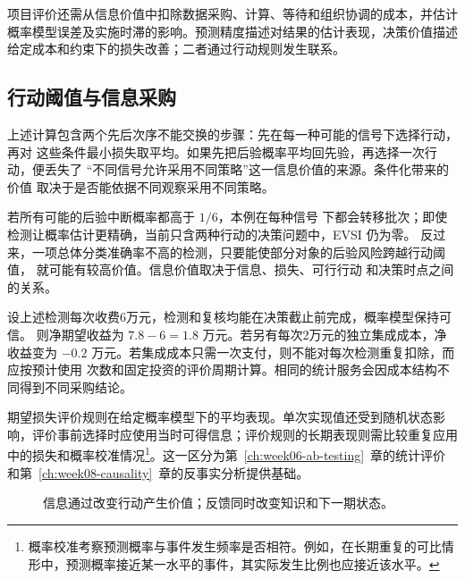 项目评价还需从信息价值中扣除数据采购、计算、等待和组织协调的成本，并估计概率模型误差及实施时滞的影响。预测精度描述对结果的估计表现，决策价值描述给定成本和约束下的损失改善；二者通过行动规则发生联系\cite{bk2020}。

\subsection{行动阈值与信息采购}
上述计算包含两个先后次序不能交换的步骤：先在每一种可能的信号下选择行动，再对
这些条件最小损失取平均。如果先把后验概率平均回先验，再选择一次行动，便丢失了
“不同信号允许采用不同策略”这一信息价值的来源。条件化带来的价值
取决于是否能依据不同观察采用不同策略。

若所有可能的后验中断概率都高于 \(1/6\)，本例在每种信号
下都会转移批次；即使检测让概率估计更精确，当前只含两种行动的决策问题中，EVSI 仍为零。
反过来，一项总体分类准确率不高的检测，只要能使部分对象的后验风险跨越行动阈值，
就可能有较高价值。信息价值取决于信息、损失、可行行动
和决策时点之间的关系。

\begin{example}[把信息服务作为项目评价对象]
设上述检测每次收费6万元，检测和复核均能在决策截止前完成，概率模型保持可信。
则净期望收益为 \(7.8-6=1.8\) 万元。若另有每次2万元的独立集成成本，净收益变为
\(-0.2\) 万元。若集成成本只需一次支付，则不能对每次检测重复扣除，而应按预计使用
次数和固定投资的评价周期计算。相同的统计服务会因成本结构不同得到不同采购结论。
\end{example}

期望损失评价规则在给定概率模型下的平均表现。单次实现值还受到随机状态影响，评价事前选择时应使用当时可得信息；评价规则的长期表现则需比较重复应用中的损失和概率校准情况\footnote{概率校准考察预测概率与事件发生频率是否相符。例如，在长期重复的可比情形中，预测概率接近某一水平的事件，其实际发生比例也应接近该水平。}。这一区分为第~\ref{ch:week06-ab-testing}~章的统计评价和第~\ref{ch:week08-causality}~章的反事实分析提供基础。

\begin{figure}[htbp]
\centering
{}
\caption{信息通过改变行动产生价值；反馈同时改变知识和下一期状态。}
\end{figure}

